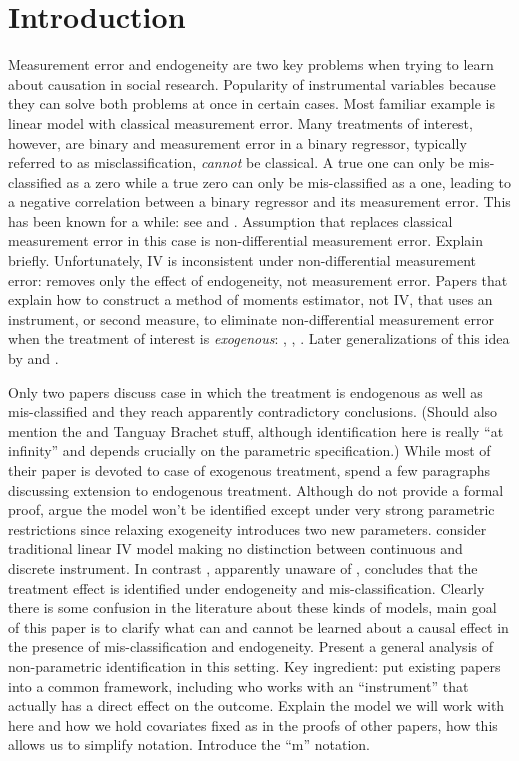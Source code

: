 \section{Introduction}

Measurement error and endogeneity are two key problems when trying to learn about causation in social research.
Popularity of instrumental variables because they can solve both problems at once in certain cases.
Most familiar example is linear model with classical measurement error.
Many treatments of interest, however, are binary and measurement error in a binary regressor, typically referred to as misclassification, \emph{cannot} be classical.
A true one can only be mis-classified as a zero while a true zero can only be mis-classified as a one, leading to a negative correlation between a binary regressor and its measurement error.
This has been known for a while: see \cite{Aigner} and \cite{Bollinger}.
Assumption that replaces classical measurement error in this case is non-differential measurement error.
Explain briefly.
Unfortunately, IV is inconsistent under non-differential measurement error: removes only the effect of endogeneity, not measurement error.
Papers that explain how to construct a method of moments estimator, not IV, that uses an instrument, or second measure, to eliminate non-differential measurement error when the treatment of interest is \emph{exogenous}: \cite{KRS}, \cite{BBS}, \cite{FL}.
Later generalizations of this idea by \cite{Lewbel} and \cite{Mahajan}.

Only two papers discuss case in which the treatment is endogenous as well as mis-classified and they reach apparently contradictory conclusions.
(Should also mention the \cite{Hausman} and Tanguay Brachet stuff, although identification here is really ``at infinity'' and depends crucially on the parametric specification.)
While most of their paper is devoted to case of exogenous treatment, \cite{FL} spend a few paragraphs discussing extension to endogenous treatment.
Although do not provide a formal proof, argue the model won't be identified except under very strong parametric restrictions since relaxing exogeneity introduces two new parameters.
\cite{FL} consider traditional linear IV model making no distinction between continuous and discrete instrument.
In contrast \cite{Mahajan}, apparently unaware of \cite{FL},  concludes that the treatment effect is identified under endogeneity and mis-classification.
Clearly there is some confusion in the literature about these kinds of models, main goal of this paper is to clarify what can and cannot be learned about a causal effect in the presence of mis-classification and endogeneity. 
Present a general analysis of non-parametric identification in this setting.
Key ingredient: put existing papers into a common framework, including \cite{Lewbel} who works with an ``instrument'' that actually has a direct effect on the outcome.
Explain the model we will work with here and how we hold covariates fixed as in the proofs of other papers, how this allows us to simplify notation.
Introduce the ``m'' notation.





